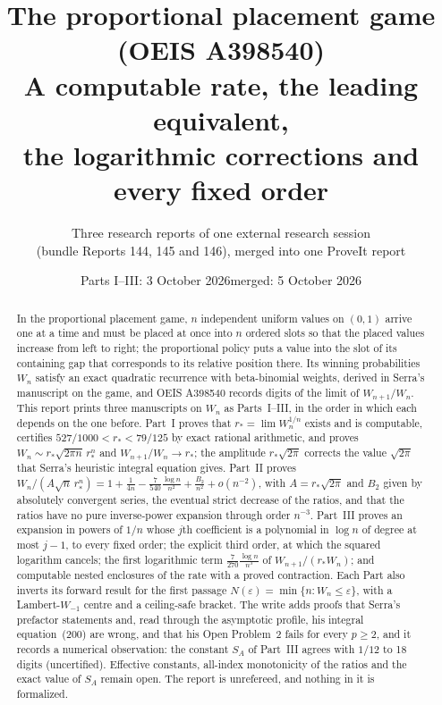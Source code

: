 \documentclass[11pt,letterpaper]{article}
\title{\textbf{The proportional placement game (OEIS A398540)}\\[7pt]
\large A computable rate, the leading equivalent,\\ the logarithmic corrections and every fixed order}
\author{Three research reports of one external research session\\(bundle Reports 144, 145 and 146), merged into one ProveIt report}
\date{Parts I--III: 3 October 2026\quad merged: 5 October 2026}
\theoremstyle{remark}\newtheorem{remark}[theorem]{Remark}
\numberwithin{equation}{section}
\begin{document}
\hypersetup{pageanchor=false}
\maketitle
\begin{abstract}
In the proportional placement game, $n$ independent uniform values on $(0,1)$ arrive one at a time and must be placed at once into $n$ ordered slots so that the placed values increase from left to right; the proportional policy puts a value into the slot of its containing gap that corresponds to its relative position there. Its winning probabilities $W_n$ satisfy an exact quadratic recurrence with beta-binomial weights, derived in Serra's manuscript on the game, and OEIS A398540 records digits of the limit of $W_{n+1}/W_n$. This report prints three manuscripts on $W_n$ as Parts~I--III, in the order in which each depends on the one before. Part~I proves that $r_*=\lim W_n^{1/n}$ exists and is computable, certifies $527/1000<r_*<79/125$ by exact rational arithmetic, and proves $W_n\sim r_*\sqrt{2\pi n}\,r_*^n$ and $W_{n+1}/W_n\to r_*$; the amplitude $r_*\sqrt{2\pi}$ corrects the value $\sqrt{2\pi}$ that Serra's heuristic integral equation gives. Part~II proves $W_n/(A\sqrt n\,r_*^n)=1+\frac1{4n}-\frac7{540}\frac{\log n}{n^2}+\frac{B_2}{n^2}+o(n^{-2})$, with $A=r_*\sqrt{2\pi}$ and $B_2$ given by absolutely convergent series, the eventual strict decrease of the ratios, and that the ratios have no pure inverse-power expansion through order $n^{-3}$. Part~III proves an expansion in powers of $1/n$ whose $j$th coefficient is a polynomial in $\log n$ of degree at most $j-1$, to every fixed order; the explicit third order, at which the squared logarithm cancels; the first logarithmic term $\frac7{270}\frac{\log n}{n^3}$ of $W_{n+1}/(r_*W_n)$; and computable nested enclosures of the rate with a proved contraction. Each Part also inverts its forward result for the first passage $N(\varepsilon)=\min\{n:W_n\le\varepsilon\}$, with a Lambert-$W_{-1}$ centre and a ceiling-safe bracket. The write adds proofs that Serra's prefactor statements and, read through the asymptotic profile, his integral equation~(200) are wrong, and that his Open Problem~2 fails for every $p\ge2$, and it records a numerical observation: the constant $S_A$ of Part~III agrees with $1/12$ to 18 digits (uncertified). Effective constants, all-index monotonicity of the ratios and the exact value of $S_A$ remain open. The report is unrefereed, and nothing in it is formalized.
\end{abstract}
\hypersetup{pageanchor=true}
\setcounter{tocdepth}{1}
{\small\setlength{\parskip}{0pt}\tableofcontents}
\newpage
\end{document}
